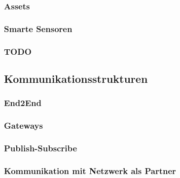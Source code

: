 \subsubsection{Assets}
\subsubsection{Smarte Sensoren}
\subsubsection{TODO}

\subsection{Kommunikationsstrukturen}
\subsubsection{End2End}
\subsubsection{Gateways}
\subsubsection{Publish-Subscribe}
\subsubsection{Kommunikation mit Netzwerk als Partner}